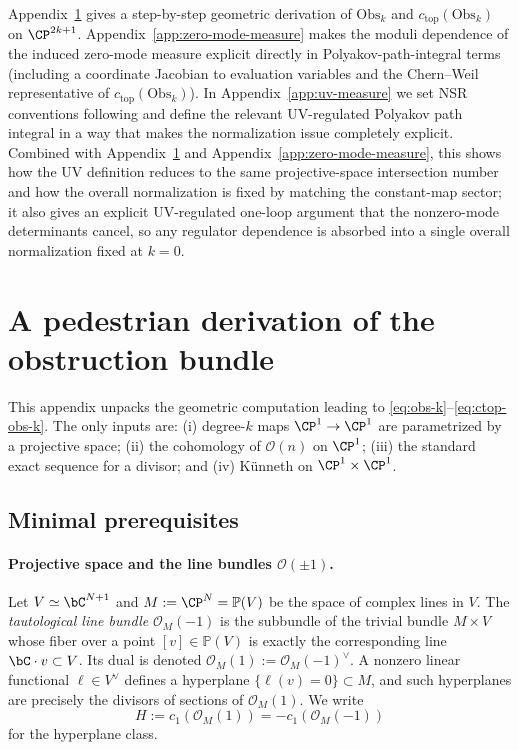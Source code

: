 \documentclass[12pt]{article}
\begin{document}
Appendix~\ref{app:pedestrian-obstruction} gives a step-by-step geometric
derivation of $\mathrm{Obs}_k$ and $c_{\mathrm{top}}(\mathrm{Obs}_k)$ on
$\CP^{2k+1}$. Appendix~\ref{app:zero-mode-measure} makes the moduli dependence
of the induced zero-mode measure explicit directly in Polyakov-path-integral
terms (including a coordinate Jacobian to evaluation variables and the
Chern--Weil representative of $c_{\mathrm{top}}(\mathrm{Obs}_k)$). In
Appendix~\ref{app:uv-measure} we set NSR conventions following
\cite{Yin:FoundationsStringTheory} and define the relevant UV-regulated Polyakov
path integral in a way that makes the normalization issue completely explicit.
Combined with Appendix~\ref{app:pedestrian-obstruction} and
Appendix~\ref{app:zero-mode-measure}, this shows how the UV definition reduces
to the same projective-space intersection number and how the overall
normalization is fixed by matching the constant-map sector; it also gives an
explicit UV-regulated one-loop argument that the nonzero-mode determinants
cancel, so any regulator dependence is absorbed into a single overall
normalization fixed at $k=0$.

\appendix
\section{A pedestrian derivation of the obstruction bundle}
\label{app:pedestrian-obstruction}

This appendix unpacks the geometric computation leading to
\eqref{eq:obs-k}--\eqref{eq:ctop-obs-k}. The only inputs are: (i) degree-$k$
maps $\CP^1\to\CP^1$ are parametrized by a projective space; (ii) the
cohomology of $\mathcal{O}(n)$ on $\CP^1$; (iii) the standard exact sequence
for a divisor; and (iv) K\"unneth on $\CP^1\times\CP^1$.

\subsection{Minimal prerequisites}
\paragraph{Projective space and the line bundles $\mathcal{O}(\pm1)$.}
Let $V\simeq\bC^{N+1}$ and $M:=\CP^N=\mathbb{P}(V)$ be the space of complex
lines in $V$. The \emph{tautological line bundle} $\mathcal{O}_M(-1)$ is the
subbundle of the trivial bundle $M\times V$ whose fiber over a point
$[v]\in\mathbb{P}(V)$ is exactly the corresponding line $\bC\cdot v\subset V$.
Its dual is denoted $\mathcal{O}_M(1):=\mathcal{O}_M(-1)^\vee$. A nonzero
linear functional $\ell\in V^\vee$ defines a hyperplane $\{\ell(v)=0\}\subset M$,
and such hyperplanes are precisely the divisors of sections of $\mathcal{O}_M(1)$.
We write
\begin{equation*}
  H := c_1(\mathcal{O}_M(1)) = -c_1(\mathcal{O}_M(-1))
\end{equation*}
for the hyperplane class.
\end{document}
